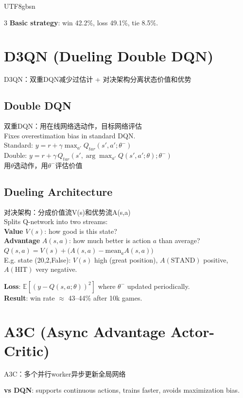 \documentclass[9pt,landscape,a4paper]{article}
\newcommand{\zhint}[1]{{\scriptsize\color{gray!70!black}#1}}
\begin{document}
\begin{CJK}{UTF8}{gbsn}
\begin{multicols}{3}
\textbf{Basic strategy}: win 42.2\%, loss 49.1\%, tie 8.5\%.

\section{D3QN (Dueling Double DQN)}
\zhint{D3QN：双重DQN减少过估计 + 对决架构分离状态价值和优势}

\subsection{Double DQN}
\zhint{双重DQN：用在线网络选动作，目标网络评估}\\
Fixes overestimation bias in standard DQN.\\
Standard: $y = r + \gamma \max_{a'} Q_{tar}(s', a'; \theta^-)$\\
Double: $y = r + \gamma \, Q_{tar}(s', \arg\max_{a'} Q(s', a'; \theta); \theta^-)$\\
\zhint{用$\theta$选动作，用$\theta^-$评估价值}

\subsection{Dueling Architecture}
\zhint{对决架构：分成价值流V(s)和优势流A(s,a)}\\
Splits Q-network into two streams:\\
\textbf{Value} $V(s)$: how good is this state?\\
\textbf{Advantage} $A(s,a)$: how much better is action $a$ than average?\\
$Q(s,a) = V(s) + \big(A(s,a) - \text{mean}_a A(s,a)\big)$\\
E.g. state (20,2,False): $V(s)$ high (great position), $A(\text{STAND})$ positive, $A(\text{HIT})$ very negative.

\textbf{Loss}: $\mathbb{E}[(y - Q(s,a;\theta))^2]$ where $\theta^-$ updated periodically.\\
\textbf{Result}: win rate $\approx$ 43--44\% after 10k games.

\section{A3C (Async Advantage Actor-Critic)}
\zhint{A3C：多个并行worker异步更新全局网络}

\textbf{vs DQN}: supports continuous actions, trains faster, avoids maximization bias.


\end{multicols}
\end{CJK}
\end{document}
